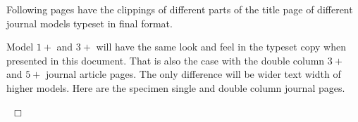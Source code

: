 \documentclass[a4paper,12pt]{article}
\begin{document}
Following pages have the clippings of different parts of
the title page of different journal models typeset in final
format.

Model $1+$ and $3+$  will have the same look and
feel in the typeset copy when presented in this document. That is
also the case with the double column $3+$ and $5+$ journal article
pages. The only difference will be wider text width of
higher models.  Here are the specimen single and double column journal 
pages.

\vspace*{-.5pc}

\enlargethispage*{\baselineskip}

\src{}\hypertarget{sc}{}
\def\rulecolor{blue!70}
\hyperlink{bsc}{}
\def\rulecolor{orange}

\src{}\hypertarget{dc}{}
\def\rulecolor{blue!70}
\hyperlink{bsc}{}
\def\rulecolor{orange}

~\hfill $\Box$
\end{document}

